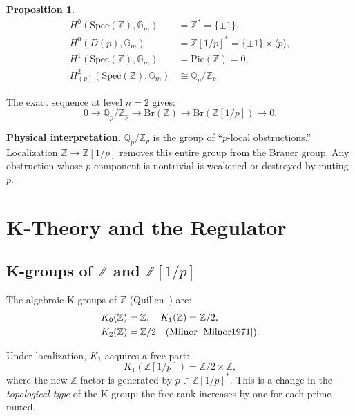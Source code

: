 \documentclass[aps,prd,twocolumn,superscriptaddress,nofootinbib]{revtex4-2}
\newtheorem{proposition}[theorem]{Proposition}
\newcommand{\Spec}{\mathrm{Spec}}
\newcommand{\Br}{\mathrm{Br}}
\newcommand{\Zp}{\mathbb{Z}[1/p]}
\newcommand{\Qp}{\mathbb{Q}_p}
\newcommand{\Gm}{\mathbb{G}_m}
\begin{document}
\begin{proposition}
\label{prop:local_cohom}
\begin{align}
  H^0(\Spec(\mathbb{Z}), \Gm) &= \mathbb{Z}^* = \{\pm 1\}, \\
  H^0(D(p), \Gm) &= \Zp^* = \{\pm 1\} \times \langle p \rangle, \\
  H^1(\Spec(\mathbb{Z}), \Gm) &= \mathrm{Pic}(\mathbb{Z}) = 0, \\
  H^2_{(p)}(\Spec(\mathbb{Z}), \Gm) &\cong \Qp/\mathbb{Z}_p.
  \label{eq:local_cohom}
\end{align}
\end{proposition}

The exact sequence at level $n=2$ gives:
\begin{equation}
  0 \to \Qp/\mathbb{Z}_p \to \Br(\mathbb{Z})
  \to \Br(\Zp) \to 0.
  \label{eq:brauer_ses}
\end{equation}

\textbf{Physical interpretation.}
$\Qp/\mathbb{Z}_p$ is the group of ``$p$-local obstructions.''
Localization $\mathbb{Z} \to \Zp$ removes this entire group from
the Brauer group. Any obstruction whose $p$-component is nontrivial
is weakened or destroyed by muting $p$.

\section{K-Theory and the Regulator}
\label{sec:ktheory}

\subsection{K-groups of $\mathbb{Z}$ and $\Zp$}

The algebraic K-groups of $\mathbb{Z}$ (Quillen~\cite{Quillen1973})
are:
\begin{align}
  K_0(\mathbb{Z}) &= \mathbb{Z}, \quad K_1(\mathbb{Z}) = \mathbb{Z}/2, \\
  K_2(\mathbb{Z}) &= \mathbb{Z}/2 \quad \text{(Milnor~\cite{Milnor1971})}.
\end{align}

Under localization, $K_1$ acquires a free part:
\begin{equation}
  K_1(\Zp) = \mathbb{Z}/2 \times \mathbb{Z},
  \label{eq:k1_local}
\end{equation}
where the new $\mathbb{Z}$ factor is generated by $p \in \Zp^*$.
This is a change in the \emph{topological type} of the K-group:
the free rank increases by one for each prime muted.
\end{document}
